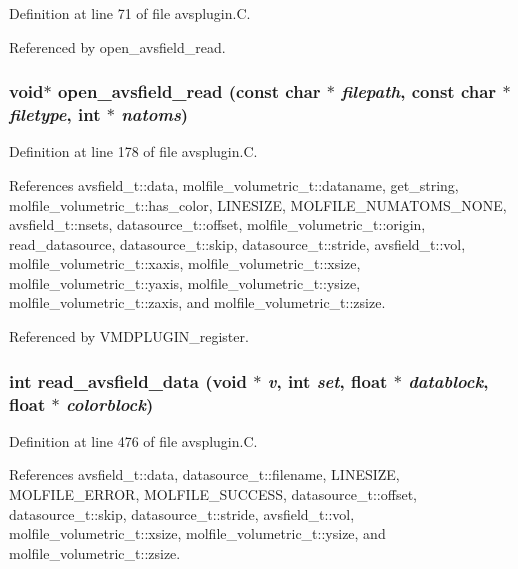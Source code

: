 Definition at line 71 of file avsplugin.C.

Referenced by open\_\-avsfield\_\-read.
\subsubsection{\setlength{\rightskip}{0pt plus 5cm}void$\ast$ open\_\-avsfield\_\-read (const char $\ast$ {\em filepath}, const char $\ast$ {\em filetype}, int $\ast$ {\em natoms})\hspace{0.3cm}{\tt  [static]}}\label{avsplugin_8C_a12}




Definition at line 178 of file avsplugin.C.

References avsfield\_\-t::data, molfile\_\-volumetric\_\-t::dataname, get\_\-string, molfile\_\-volumetric\_\-t::has\_\-color, LINESIZE, MOLFILE\_\-NUMATOMS\_\-NONE, avsfield\_\-t::nsets, datasource\_\-t::offset, molfile\_\-volumetric\_\-t::origin, read\_\-datasource, datasource\_\-t::skip, datasource\_\-t::stride, avsfield\_\-t::vol, molfile\_\-volumetric\_\-t::xaxis, molfile\_\-volumetric\_\-t::xsize, molfile\_\-volumetric\_\-t::yaxis, molfile\_\-volumetric\_\-t::ysize, molfile\_\-volumetric\_\-t::zaxis, and molfile\_\-volumetric\_\-t::zsize.

Referenced by VMDPLUGIN\_\-register.
\subsubsection{\setlength{\rightskip}{0pt plus 5cm}int read\_\-avsfield\_\-data (void $\ast$ {\em v}, int {\em set}, float $\ast$ {\em datablock}, float $\ast$ {\em colorblock})\hspace{0.3cm}{\tt  [static]}}\label{avsplugin_8C_a14}




Definition at line 476 of file avsplugin.C.

References avsfield\_\-t::data, datasource\_\-t::filename, LINESIZE, MOLFILE\_\-ERROR, MOLFILE\_\-SUCCESS, datasource\_\-t::offset, datasource\_\-t::skip, datasource\_\-t::stride, avsfield\_\-t::vol, molfile\_\-volumetric\_\-t::xsize, molfile\_\-volumetric\_\-t::ysize, and molfile\_\-volumetric\_\-t::zsize.

